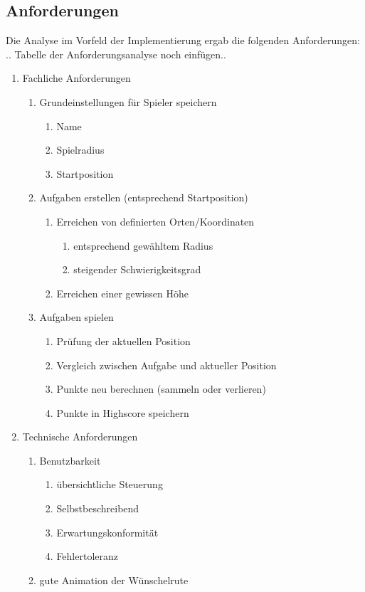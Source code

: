 \subsection{Anforderungen}
Die Analyse im Vorfeld der Implementierung ergab die folgenden Anforderungen:
.. Tabelle der Anforderungsanalyse noch einfügen..
\begin{enumerate}
\item Fachliche Anforderungen
	\begin{enumerate}
		\item Grundeinstellungen für Spieler speichern
		\begin{enumerate}
			\item Name
			\item Spielradius		
			\item Startposition
		\end{enumerate}
		\item Aufgaben erstellen (entsprechend Startposition)
		\begin{enumerate}
			\item Erreichen von definierten Orten/Koordinaten
			\begin{enumerate}
				\item entsprechend gewähltem Radius
				\item steigender Schwierigkeitsgrad
			\end{enumerate}
			\item Erreichen einer gewissen Höhe
		\end{enumerate}
		\item Aufgaben spielen
		\begin{enumerate}
			\item Prüfung der aktuellen Position
			\item Vergleich zwischen Aufgabe und aktueller Position
			\item Punkte neu berechnen (sammeln oder verlieren)
			\item Punkte in Highscore speichern
		\end{enumerate}
	\end{enumerate}
	\item Technische Anforderungen
	\begin{enumerate}
		\item Benutzbarkeit
		\begin{enumerate}
			\item übersichtliche Steuerung
			\item Selbstbeschreibend
			\item Erwartungskonformität
			\item Fehlertoleranz
		\end{enumerate}
		\item gute Animation der Wünschelrute
	\end{enumerate}
\end{enumerate}
